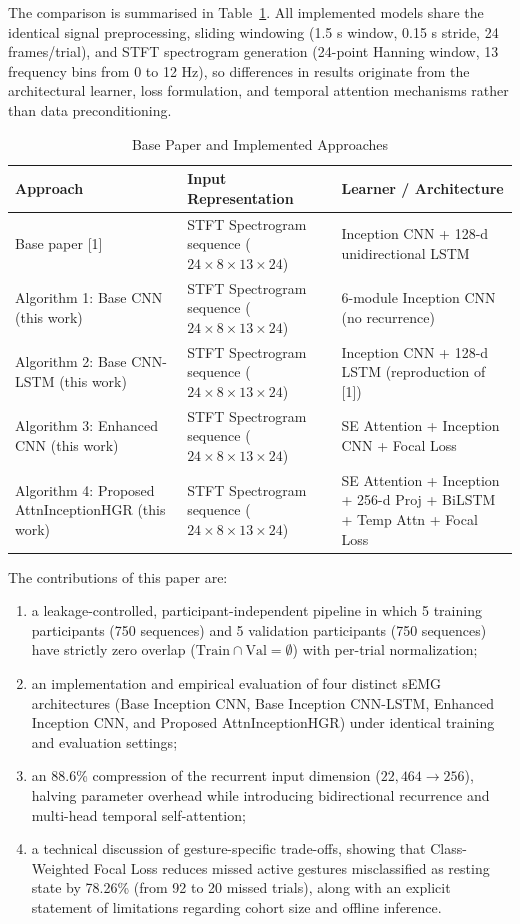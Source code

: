 \documentclass[conference]{IEEEtran}
\begin{document}
The comparison is summarised in Table~\ref{tab:approaches}. All implemented models share the identical signal preprocessing, sliding windowing (1.5 s window, 0.15 s stride, 24 frames/trial), and STFT spectrogram generation (24-point Hanning window, 13 frequency bins from 0 to 12 Hz), so differences in results originate from the architectural learner, loss formulation, and temporal attention mechanisms rather than data preconditioning.

\begin{table}[h]
\centering
\caption{Base Paper and Implemented Approaches}
\label{tab:approaches}
\begin{tabular}{p{2.3cm}p{2.7cm}p{2.6cm}}
\toprule
\textbf{Approach} & \textbf{Input Representation} & \textbf{Learner / Architecture} \\
\midrule
Base paper [1] & STFT Spectrogram sequence ($24 \times 8 \times 13 \times 24$) & Inception CNN + 128-d unidirectional LSTM \\
Algorithm 1: Base CNN (this work) & STFT Spectrogram sequence ($24 \times 8 \times 13 \times 24$) & 6-module Inception CNN (no recurrence) \\
Algorithm 2: Base CNN-LSTM (this work) & STFT Spectrogram sequence ($24 \times 8 \times 13 \times 24$) & Inception CNN + 128-d LSTM (reproduction of [1]) \\
Algorithm 3: Enhanced CNN (this work) & STFT Spectrogram sequence ($24 \times 8 \times 13 \times 24$) & SE Attention + Inception CNN + Focal Loss \\
Algorithm 4: Proposed AttnInceptionHGR (this work) & STFT Spectrogram sequence ($24 \times 8 \times 13 \times 24$) & SE Attention + Inception + 256-d Proj + BiLSTM + Temp Attn + Focal Loss \\
\bottomrule
\end{tabular}
\end{table}

The contributions of this paper are:
\begin{enumerate}
    \item[(a)] a leakage-controlled, participant-independent pipeline in which 5 training participants (750 sequences) and 5 validation participants (750 sequences) have strictly zero overlap ($\text{Train} \cap \text{Val} = \emptyset$) with per-trial normalization;
    \item[(b)] an implementation and empirical evaluation of four distinct sEMG architectures (Base Inception CNN, Base Inception CNN-LSTM, Enhanced Inception CNN, and Proposed AttnInceptionHGR) under identical training and evaluation settings;
    \item[(c)] an 88.6\% compression of the recurrent input dimension ($22,464 \to 256$), halving parameter overhead while introducing bidirectional recurrence and multi-head temporal self-attention;
    \item[(d)] a technical discussion of gesture-specific trade-offs, showing that Class-Weighted Focal Loss reduces missed active gestures misclassified as resting state by 78.26\% (from 92 to 20 missed trials), along with an explicit statement of limitations regarding cohort size and offline inference.
\end{enumerate}
\end{document}
